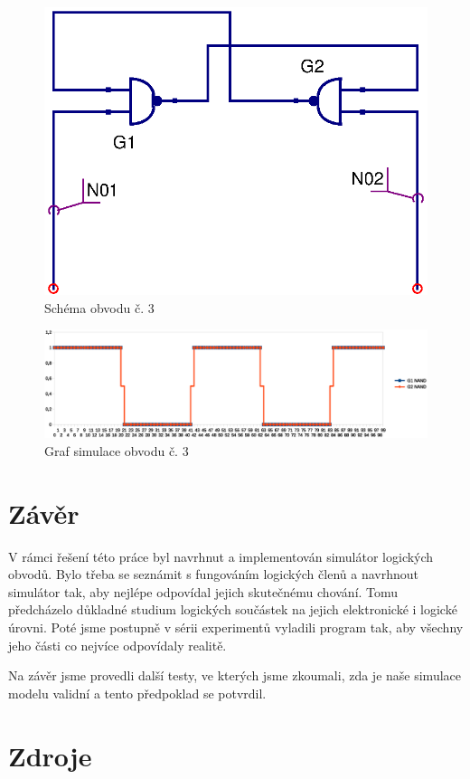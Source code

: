 \documentclass[11pt,a4paper]{article}
\begin{document}
			\begin{figure}[!htb]
				\centering
					\includegraphics[scale=.5]{input3.eps}
					\caption{Schéma obvodu č. 3}
					\label{fig:scheme3}
			\end{figure}

			\begin{figure}[!htb]
				\centering
					\includegraphics[scale=.55]{graf3.eps}
					\caption{Graf simulace obvodu č. 3}
					\label{fig:graf3}
			\end{figure}


	\section{Závěr}
		V rámci řešení této práce byl navrhnut a implementován simulátor logických obvodů. Bylo třeba se seznámit s fungováním logických členů a navrhnout simulátor tak, aby nejlépe odpovídal jejich skutečnému chování. Tomu předcházelo důkladné studium logických součástek na jejich elektronické i logické úrovni. Poté jsme postupně v sérii experimentů vyladili program tak, aby všechny jeho části co nejvíce odpovídaly realitě.

		Na závěr jsme provedli další testy, ve kterých jsme zkoumali, zda je naše simulace modelu validní a tento předpoklad se potvrdil.

	\section{Zdroje}
		
\end{document}
